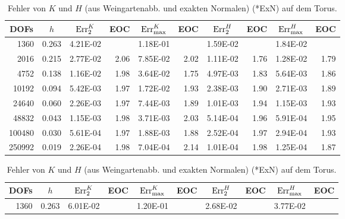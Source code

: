 \begin{beispiel}[Torus]
\begin{table}[htbp]
      \centering
      \begin{tabular}{|r|r|r|r|r|r|r|r|r|r|}
      \hline
      \multicolumn{1}{|c|}{DOFs} & \multicolumn{1}{c|}{\( h \)} & \multicolumn{1}{c|}{\( \text{Err}_{2}^{K} \)} & \multicolumn{1}{c|}{EOC} & 
        \multicolumn{1}{c|}{\( \text{Err}_{\max}^{K} \)} & \multicolumn{1}{c|}{EOC} & \multicolumn{1}{c|}{\( \text{Err}_{2}^{H} \)} &
        \multicolumn{1}{c|}{EOC} & \multicolumn{1}{c|}{\( \text{Err}_{\max}^{H} \)} & \multicolumn{1}{c|}{EOC} \\ \hline
        1360 & 0.263 & 4.21E-02 & \multicolumn{1}{l|}{} & 1.18E-01 & \multicolumn{1}{l|}{} & 1.59E-02 & \multicolumn{1}{l|}{} & 1.84E-02 & \multicolumn{1}{l|}{} \\ \hline
2016 & 0.215 & 2.77E-02 & 2.06 & 7.85E-02 & 2.02 & 1.11E-02 & 1.76 & 1.28E-02 & 1.79 \\ \hline
4752 & 0.138 & 1.16E-02 & 1.98 & 3.64E-02 & 1.75 & 4.97E-03 & 1.83 & 5.64E-03 & 1.86 \\ \hline
10192 & 0.094 & 5.42E-03 & 1.97 & 1.72E-02 & 1.93 & 2.38E-03 & 1.90 & 2.71E-03 & 1.89 \\ \hline
24640 & 0.060 & 2.26E-03 & 1.97 & 7.44E-03 & 1.89 & 1.01E-03 & 1.94 & 1.15E-03 & 1.93 \\ \hline
48832 & 0.043 & 1.15E-03 & 1.98 & 3.71E-03 & 2.03 & 5.14E-04 & 1.96 & 5.91E-04 & 1.95 \\ \hline
100480 & 0.030 & 5.61E-04 & 1.97 & 1.88E-03 & 1.88 & 2.52E-04 & 1.97 & 2.94E-04 & 1.93 \\ \hline
250992 & 0.019 & 2.26E-04 & 1.98 & 7.04E-04 & 2.14 & 1.01E-04 & 1.98 & 1.25E-04 & 1.87 \\ \hline
      \end{tabular}
      \caption[Gauß-/mittlere Krümmung aus Weingartenabb. auf Torus (ExN)]{Fehler von \( K \) und \( H \) (aus Weingartenabb. und
      exakten Normalen) (*ExN) auf dem Torus.}
      \label{tabWeingartenFehlerTorusExN}
      \vspace{10pt}
      \begin{tabular}{|r|r|r|r|r|r|r|r|r|r|}
      \hline
      \multicolumn{1}{|c|}{DOFs} & \multicolumn{1}{c|}{\( h \)} & \multicolumn{1}{c|}{\( \text{Err}_{2}^{K} \)} & \multicolumn{1}{c|}{EOC} & 
        \multicolumn{1}{c|}{\( \text{Err}_{\max}^{K} \)} & \multicolumn{1}{c|}{EOC} & \multicolumn{1}{c|}{\( \text{Err}_{2}^{H} \)} &
        \multicolumn{1}{c|}{EOC} & \multicolumn{1}{c|}{\( \text{Err}_{\max}^{H} \)} & \multicolumn{1}{c|}{EOC} \\ \hline
      1360 & 0.263 & 6.01E-02 & \multicolumn{1}{l|}{} & 1.20E-01 & \multicolumn{1}{l|}{} & 2.68E-02 & \multicolumn{1}{l|}{} & 3.77E-02 & \multicolumn{1}{l|}{} \\ \hline

\end{tabular}
\end{table}
\end{beispiel}
